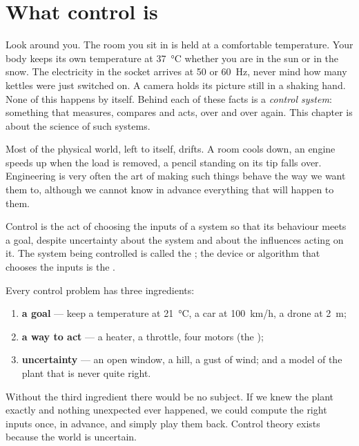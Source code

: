 \section{What control is}

Look around you. The room you sit in is held at a comfortable temperature. Your body keeps its own temperature at \SI{37}{\celsius} whether you are in the sun or in the snow. The electricity in the socket arrives at 50 or \SI{60}{Hz}, never mind how many kettles were just switched on. A camera holds its picture still in a shaking hand. None of this happens by itself. Behind each of these facts is a \emph{control system}: something that measures, compares and acts, over and over again. This chapter is about the science of such systems.


Most of the physical world, left to itself, drifts. A room cools down, an engine speeds up when the load is removed, a pencil standing on its tip falls over. Engineering is very often the art of making such things behave the way we want them to, although we cannot know in advance everything that will happen to them.

\begin{definition}{Control}
 is the act of choosing the inputs of a system so that its behaviour meets a goal, despite uncertainty about the system and about the influences acting on it. The system being controlled is called the ; the device or algorithm that chooses the inputs is the .
\end{definition}

Every control problem has three ingredients:
\begin{enumerate}
  \item \textbf{a goal} — keep a temperature at \SI{21}{\celsius}, a car at \SI{100}{km/h}, a drone at \SI{2}{m};
  \item \textbf{a way to act} — a heater, a throttle, four motors (the );
  \item \textbf{uncertainty} — an open window, a hill, a gust of wind; and a model of the plant that is never quite right.
\end{enumerate}
Without the third ingredient there would be no subject. If we knew the plant exactly and nothing unexpected ever happened, we could compute the right inputs once, in advance, and simply play them back. Control theory exists because the world is uncertain.

